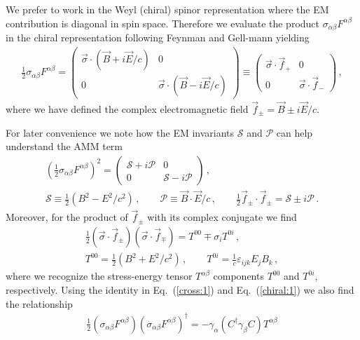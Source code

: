 \documentclass[addchapnum]{ws-rv961x669} %
\newcommand{\req}[1]{Eq.~(\ref{#1})}
\begin{document}
We prefer to work in the Weyl (chiral) spinor representation where the EM contribution is diagonal in spin space. Therefore we evaluate the product $\sigma_{\alpha\beta}F^{\alpha\beta}$ in the chiral representation following Feynman and Gell-mann\cite{Feynman:1958ty} yielding
\begin{align}
    \label{chiral:1}
    \frac{1}{2}\sigma_{\alpha\beta}F^{\alpha\beta}=
    \begin{pmatrix}
        \vec{\sigma}\cdot(\vec{B}+i\vec{E}/c) & 0\\
        0 & \vec{\sigma}\cdot(\vec{B}-i\vec{E}/c)
    \end{pmatrix}\equiv
    \begin{pmatrix}
        \vec{\sigma}\cdot\vec{f}_{+} & 0 \\
        0 & \vec{\sigma}\cdot\vec{f}_{-}
    \end{pmatrix}\,,
\end{align}
where we have defined the complex electromagnetic field $\vec{f}_{\pm}=\vec{B}\pm i\vec{E}/c$.

For later convenience we note how the EM invariants $\mathcal{S}$ and $\mathcal{P}$ can help understand the AMM term 
\begin{gather}
    \left(\frac{1}{2}\sigma_{\alpha\beta}F^{\alpha\beta}\right)^{2}=
    \begin{pmatrix}
        \mathcal{S}+i\mathcal{P} & 0\\
        0 & \mathcal{S}-i\mathcal{P}
    \end{pmatrix}\,,\\
    \mathcal{S}\equiv\frac{1}{2}\left(B^{2}-E^{2}/c^{2}\right)\,,\qquad
    \mathcal{P}\equiv\vec{B}\cdot\vec{E}/c\,,\qquad
    \frac{1}{2}\vec{f}_{\pm}\cdot\vec{f}_{\pm}=\mathcal{S}\pm i\mathcal{P}\,.
\end{gather}
Moreover, for the product of $\vec{f}_{\pm}$ with its complex conjugate we find
\begin{align}
        \label{cross:1}
        \frac{1}{2}\left(\vec{\sigma}\cdot\vec{f}_{\pm}\right)\left(\vec{\sigma}\cdot\vec{f}_{\mp}\right)=T^{00}\mp \sigma_{i}T^{0i}\,,\\
        T^{00}=\frac{1}{2}\left(B^{2}+E^{2}/c^{2}\right)\,,\qquad
        T^{0i}=\frac{1}{c}\varepsilon_{ijk}E_{j}B_{k}\,,
\end{align}
where we recognize the  stress-energy tensor $T^{\alpha\beta}$ components $T^{00}$ and $T^{0i}$, respectively. Using the identity in \req{cross:1} and \req{chiral:1} we also find the relationship
\begin{align}
    \label{cross:2}
    \frac{1}{2}\left(\sigma_{\alpha\beta}F^{\alpha\beta}\right)\left(\sigma_{\alpha\beta}F^{\alpha\beta}\right)^{\dag}=
    -\gamma_{\alpha}\left(C^{\dag}\gamma_{\beta}C\right)T^{\alpha\beta}
\end{align}
\end{document}
